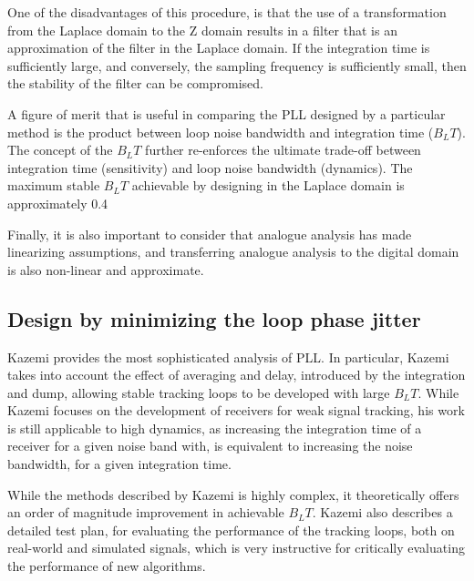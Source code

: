 One of the disadvantages of this procedure, is that the use of a transformation from the Laplace domain to the Z domain results in a filter that is an approximation of the filter in the Laplace domain. If the integration time is sufficiently large, and conversely, the sampling frequency is sufficiently small, then the stability of the filter can be compromised. 

A figure of merit that is useful in comparing the \ac{PLL} designed by a particular method is the product between loop noise bandwidth and integration time ($B_LT$). The concept of the $B_LT$ further re-enforces the ultimate trade-off between integration time (sensitivity) and loop noise bandwidth (dynamics). The maximum stable $B_LT$ achievable by designing in the Laplace domain is approximately 0.4 \cite{Kazemi2008,KazemiPHD}

Finally, it is also important to consider that analogue analysis has made linearizing assumptions, and transferring analogue analysis to the digital domain is also non-linear and approximate\cite{Dempster}. 

\subsection{Design by minimizing the loop phase jitter}

Kazemi\cite{KazemiPHD,Kazemi2008} provides the most sophisticated analysis of \ac{PLL}. In particular, Kazemi takes into account the effect of averaging and delay, introduced by the integration and dump, allowing stable tracking loops to be developed with large $B_LT$. While Kazemi focuses on the development of receivers for weak signal tracking, his work is still applicable to high dynamics, as increasing the integration time of a receiver for a given noise band with, is equivalent to increasing the noise bandwidth, for a given integration time. 

While the methods described by Kazemi is highly complex, it theoretically offers an order of magnitude improvement in achievable $B_LT$. Kazemi also describes a detailed test plan, for evaluating the performance of the tracking loops, both on real-world and simulated signals, which is very instructive for critically evaluating the performance of new algorithms.
















